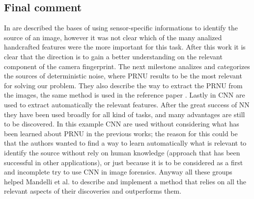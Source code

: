 \subsection{Final comment}
In \cite{Kharrazi} are described the bases of using sensor-specific informations to identify 
the source of an image, however it was not clear which of the many analized handcrafted features were the more important for this task.
After this work it is clear that the direction is to gain a better understanding on the relevant component of the camera fingerprint.\newline
The next milestone \cite{Lukas} analizes and categorizes the sources of deterministic noise, where PRNU results to be the most relevant for solving our problem.
They also describe the way to extract the PRNU from the images, the same method is used in the reference paper \cite{Mandelli}.
Lastly in \cite{Bondi} CNN are used to extract automatically the relevant features. After the great success of NN they have been used broadly for all kind of tasks,
and many advantages are still to be discovered. In this example CNN are used without considering what has been learned about PRNU in the previous works; 
the reason for this could be that the authors wanted to find a way to learn automatically what is relevant to identify the source without rely on human knowledge (approach that has been successful in other applications),
or just because it is to be considered as a first and incomplete try to use CNN in image forensics.
Anyway all these groups helped Mandelli et al. \cite{Mandelli} to describe and implement a method that relies on all the relevant aspects of their discoveries and outperforms them.